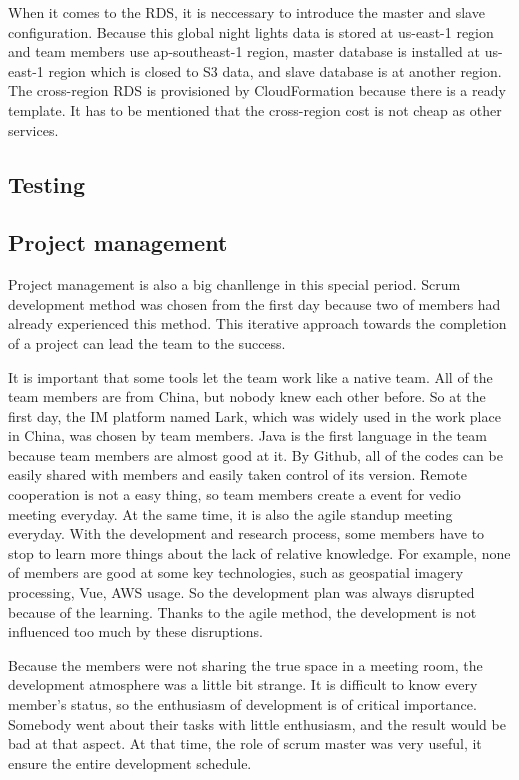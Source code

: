 \documentclass[conference]{IEEEtran}
\begin{document}
	When it comes to the RDS, it is neccessary to introduce the master and slave configuration. Because this global night lights data is stored at us-east-1 region and team members 
	use ap-southeast-1 region, master database is installed at us-east-1 region which is closed to S3 data, and slave database is at another region. The cross-region RDS is 
	provisioned by CloudFormation because there is a ready template. It has to be mentioned that the cross-region cost is not cheap as other services.
	
	
	\subsection{Testing}
	
	\subsection{Project management}
	Project management is also a big chanllenge in this special period. Scrum development method was chosen from the first day because two of members
	had already experienced this method. This iterative approach towards the completion of a project can lead the team to the success.
	
	It is important that some tools let the team work like a native team. All of the team members are from China, but nobody knew each other before. 
	So at the first day, the IM platform named Lark, which was widely used in the work place in China, was chosen by team members. Java is the first 
	language in the team because team members are almost good at it. By Github, all of the codes can be easily shared with members and easily taken 
	control of its version. Remote cooperation is not a easy thing, so team members create a event for vedio meeting everyday. At the same time, it 
	is also the agile standup meeting everyday. With the development and research process, some members have to stop to learn more things about the 
	lack of relative knowledge. For example, none of members are good at some key technologies, such as geospatial imagery processing, Vue, AWS usage. 
	So the development plan was always disrupted because of the learning. Thanks to the agile method, the development is not influenced too much by 
	these disruptions. 
	
	Because the members were not sharing the true space in a meeting room, the development atmosphere was a little bit strange. It is difficult to know 
	every member's status, so the enthusiasm of development is of critical importance. Somebody went about their tasks with little enthusiasm, and the 
	result would be bad at that aspect. At that time, the role of scrum master was very useful, it ensure the entire development schedule.
	
\end{document}
